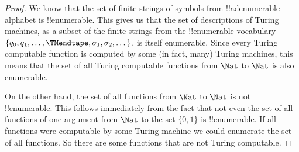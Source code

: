 \documentclass[../../../include/open-logic-section]{subfiles}
\begin{document}
\begin{proof}
We know that the set of finite strings of symbols from
!!a{denumerable} alphabet is !!{enumerable}. This gives us that the
set of descriptions of Turing machines, as a subset of the finite
strings from the !!{enumerable} vocabulary $\{q_0, q_1, \dots,
\TMendtape, \sigma_1, \sigma_2, \dots\}$, is itself enumerable.  Since
every Turing computable function is computed by some (in fact, many)
Turing machines, this means that the set of all Turing computable
functions from $\Nat$ to $\Nat$ is also enumerable.

On the other hand, the set of all functions from $\Nat$ to $\Nat$ is
not !!{enumerable}. This follows immediately from the fact that not
even the set of all functions of one argument from $\Nat$
to the set $\{0,1\}$ is !!{enumerable}.  If all functions
were computable by some Turing machine we could enumerate the set of
all functions. So there are some functions that are not
Turing computable. 
\end{proof}
\end{document}

